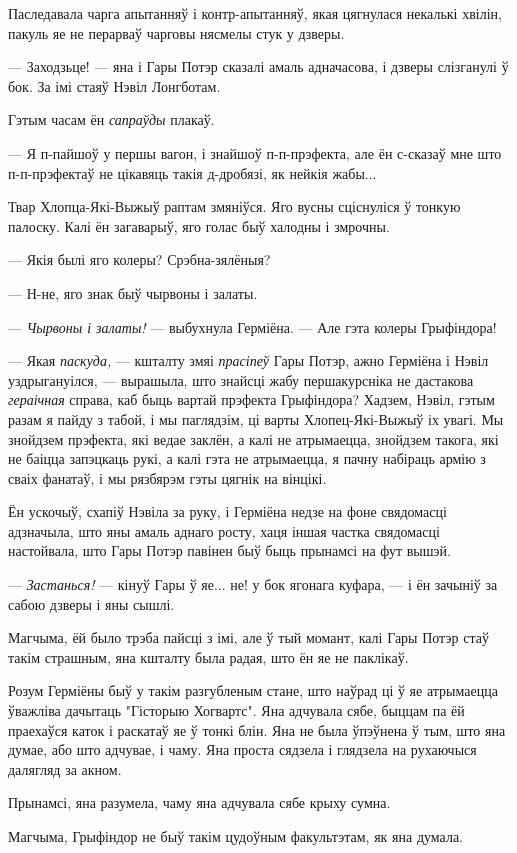 Паследавала чарга апытанняў і контр-апытанняў, якая цягнулася некалькі хвілін, пакуль
яе не перарваў чарговы нясмелы стук у дзверы.

--- Заходзьце! --- яна і Гары Потэр сказалі амаль адначасова, і дзверы слізганулі ў бок.
За імі стаяў Нэвіл Лонгботам.

Гэтым часам ён  \emph{сапраўды} плакаў. 

--- Я п-пайшоў у першы вагон, і знайшоў п-п-прэфекта, але ён с-сказаў мне 
што п-п-прэфектаў не цікавяць такія д-дробязі, як нейкія жабы...

Твар Хлопца-Які-Выжыў раптам змяніўся. Яго вусны сціснуліся ў тонкую палоску. 
Калі ён загаварыў, яго голас быў халодны і змрочны. 

--- Якія былі яго колеры? Срэбна-зялёныя?

--- Н-не, яго знак быў чырвоны і залаты.

--- \emph{Чырвоны і залаты!} --- выбухнула Герміёна. --- Але гэта колеры Грыфіндора!

--- Якая \emph{паскуда,} --- кшталту змяі \emph{прасіпеў} Гары Потэр, ажно Герміёна і 
Нэвіл уздрыгануілся, --- вырашыла, што 
знайсці жабу першакурсніка не дастакова \emph{гераічная} справа, каб быць вартай 
прэфекта Грыфіндора? Хадзем, Нэвіл, гэтым разам я пайду з табой, і мы паглядзім,
ці варты Хлопец-Які-Выжыў іх увагі. Мы знойдзем прэфекта, які ведае заклён,
а калі не атрымаецца, знойдзем такога, які не баіцца запэцкаць рукі, а калі гэта 
не атрымаецца, я пачну набіраць армію з сваіх фанатаў, і мы рязбярэм гэты
цягнік на вінцікі.

Ён ускочыў, схапіў Нэвіла за руку, і Герміёна недзе на фоне свядомасці адзначыла, 
што яны амаль аднаго росту, хаця іншая частка свядомасці настойвала, што Гары Потэр
павінен быў быць прынамсі на фут вышэй.

--- \emph{Застанься!} --- кінуў Гары ў яе... не! у бок ягонага куфара, --- і ён 
зачыніў за сабою дзверы і яны сышлі.

Магчыма, ёй было трэба пайсці з імі, але ў тый момант, калі Гары Потэр стаў 
такім страшным, яна кшталту была радая, што ён яе не паклікаў.

Розум Герміёны быў у такім разгубленым стане, што наўрад ці ў яе атрымаецца 
ўважліва дачытаць "Гісторыю Хогвартс". Яна адчувала сябе, быццам па ёй праехаўся
каток і раскатаў яе ў тонкі блін. Яна не была ўпэўнена ў тым, што яна думае,
або што адчувае, і чаму. Яна проста сядзела і глядзела на рухаючыся далягляд за
акном.

Прынамсі, яна разумела, чаму яна адчувала сябе крыху сумна.

Магчыма, Грыфіндор не быў такім цудоўным факультэтам, як яна думала.
